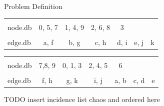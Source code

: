 \documentclass[rgb]{beamer}
\begin{document}
\begin{frame}[allowframebreaks]{Problem Definition}
             \begin{table}[htp]
                \centering
                \begin{tabular}[c]{|l|c|c|c|c|c|c|} \hline
                &&&&&&\\[-1em]
                node.db & \colorbox{blue!30}{0}, \colorbox{red!30}{5}, \colorbox{green!30}{7} & \colorbox{blue!30}{1}, \colorbox{blue!30}{4}, \colorbox{green!30}{9} & \colorbox{blue!30}{2}, \colorbox{red!30}{6}, \colorbox{green!30}{8} & \colorbox{blue!30}{3} &  & \\ \hline
                &&&&&&\\[-1em]
                edge.db & \colorbox{blue!30}{a}, \colorbox{green!30}{f} & \colorbox{blue!30}{b}, \colorbox{green!30}{g} & \colorbox{blue!30}{c}, \colorbox{green!30}{h} & \colorbox{blue!30}{d}, \colorbox{green!30}{i} & \colorbox{red!30}{e}, \colorbox{green!30}{j} & \colorbox{green!30}{k} \\  \hline
                \end{tabular}
                \vspace{0.5cm}
                
                \begin{tabular}{|l | c | c | c | c | c | c|} \hline
                &&&&&&\\[-1em]
                node.db & \colorbox{green!30}{7},\colorbox{green!30}{8}, \colorbox{green!30}{9} & \colorbox{blue!30}{0}, \colorbox{blue!30}{1}, \colorbox{blue!30}{3} & \colorbox{blue!30}{2}, \colorbox{blue!30}{4}, \colorbox{red!30}{5} & \colorbox{red!30}{6} &  & \\ \hline
                &&&&&&\\[-1em]
                 edge.db &  \colorbox{green!30}{f}, \colorbox{green!30}{h} & \colorbox{green!30}{g}, \colorbox{green!30}{k} & \colorbox{green!30}{i}, \colorbox{green!30}{j} & \colorbox{blue!30}{a}, \colorbox{blue!30}{b} & \colorbox{blue!30}{c}, \colorbox{blue!30}{d} & \colorbox{red!30}{e} \\ \hline
                \end{tabular}
            \end{table}
            
            \framebreak
            TODO insert incidence list chaos and ordered here
        \end{frame}
        
\end{document}
